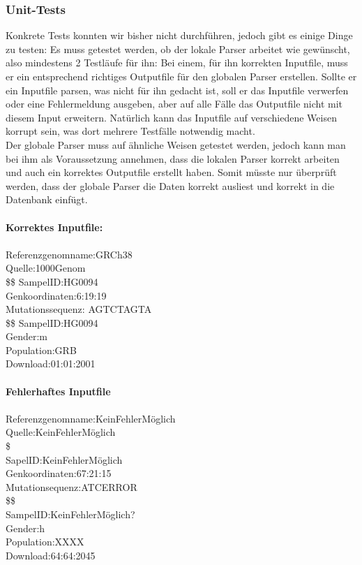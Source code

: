 \subsubsection{Unit-Tests}
Konkrete Tests konnten wir bisher nicht durchführen, jedoch gibt es einige Dinge zu testen: Es muss getestet werden, ob der lokale Parser arbeitet wie gewünscht, also mindestens 2 Testläufe für ihn: Bei einem, für ihn korrekten Inputfile, muss er ein entsprechend richtiges Outputfile für den globalen Parser erstellen. Sollte er ein Inputfile parsen, was nicht für ihn gedacht ist, soll er das Inputfile verwerfen oder eine Fehlermeldung ausgeben, aber auf alle Fälle das Outputfile nicht mit diesem Input erweitern. Natürlich kann das Inputfile auf verschiedene Weisen korrupt sein, was dort mehrere Testfälle notwendig macht.\\
Der globale Parser muss auf ähnliche Weisen getestet werden, jedoch kann man bei ihm als Voraussetzung annehmen, dass die lokalen Parser korrekt arbeiten und auch ein korrektes Outputfile erstellt haben. Somit müsste nur überprüft werden, dass der globale Parser die Daten korrekt ausliest und korrekt in die Datenbank einfügt.\\
\\
\textbf{Korrektes Inputfile:}\\
\\
Referenzgenomname:GRCh38\\
Quelle:1000Genom\\
\$\$
SampelID:HG0094\\
Genkoordinaten:6:19:19\\
Mutationssequenz: AGTCTAGTA\\
\$\$
SampelID:HG0094\\
Gender:m\\
Population:GRB\\
Download:01:01:2001\\
\\
\textbf{Fehlerhaftes Inputfile}\\
\\
Referenzgenomname:KeinFehlerMöglich\\
Quelle:KeinFehlerMöglich\\
\$\\
SapelID:KeinFehlerMöglich\\
Genkoordinaten:67:21:15\\
Mutationsequenz:ATCERROR\\
\$\$\\
SampelID:KeinFehlerMöglich?\\
Gender:h\\
Population:XXXX\\
Download:64:64:2045\\

